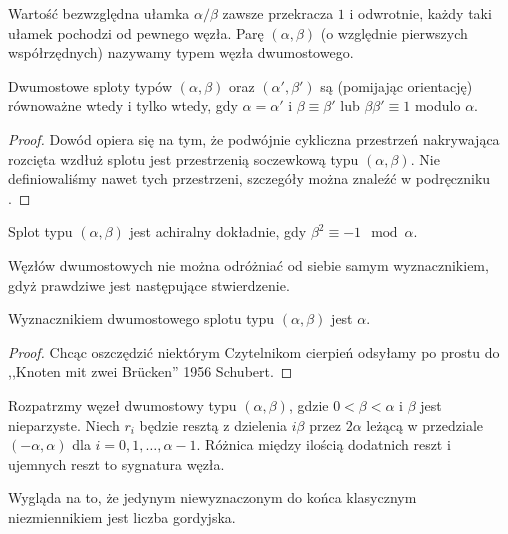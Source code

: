Wartość bezwzględna ułamka $\alpha/\beta$ zawsze przekracza $1$ i odwrotnie, każdy taki ułamek pochodzi od pewnego węzła.
Parę $(\alpha, \beta)$ (o względnie pierwszych współrzędnych) nazywamy typem węzła dwumostowego.

\begin{proposition}
\label{prp:tangle_equivalence}
	Dwumostowe sploty typów $(\alpha, \beta)$ oraz $(\alpha', \beta')$ są (pomijając orientację) równoważne wtedy i tylko wtedy, gdy $\alpha = \alpha'$ i $\beta \equiv \beta'$ lub $\beta \beta'\equiv 1$ modulo $\alpha$.
\end{proposition}

\begin{proof}
	Dowód opiera się na tym, że podwójnie cykliczna przestrzeń nakrywająca rozcięta wzdłuż splotu jest przestrzenią soczewkową typu $(\alpha, \beta)$.
	Nie definiowaliśmy nawet tych przestrzeni, szczegóły można znaleźć w podręczniku \cite{murasugi96}.
\end{proof}

\begin{proposition}
\label{prp:chiral_tangles}
	Splot typu $(\alpha, \beta)$ jest achiralny dokładnie, gdy $\beta^2 \equiv -1 \mod \alpha$.
\end{proposition}


Węzłów dwumostowych nie można odróżniać od siebie samym wyznacznikiem, gdyż prawdziwe jest następujące stwierdzenie.

\begin{proposition}
\label{prp:tangle_determinant}
	Wyznacznikiem dwumostowego splotu typu $(\alpha, \beta)$ jest $\alpha$.
\end{proposition}

\begin{proof}
	Chcąc oszczędzić niektórym Czytelnikom cierpień odsyłamy po prostu do ,,Knoten mit zwei Brücken'' 1956 Schubert.
\end{proof}

\begin{proposition}
\label{prp:tangle_signature}
	Rozpatrzmy węzeł dwumostowy typu $(\alpha, \beta)$, gdzie $0 < \beta < \alpha$ i $\beta$ jest nieparzyste.
	Niech $r_i$ będzie resztą z dzielenia $i\beta$ przez $2\alpha$ leżącą w przedziale $(-\alpha, \alpha)$ dla $i = 0, 1, \ldots, \alpha - 1$.
	Różnica między ilością dodatnich reszt i ujemnych reszt to sygnatura węzła.
\end{proposition}

Wygląda na to, że jedynym niewyznaczonym do końca klasycznym niezmiennikiem jest liczba gordyjska.

